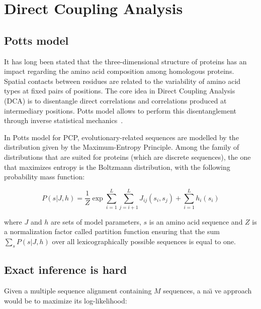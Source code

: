 \section{Direct Coupling Analysis}

    \subsection{Potts model} \label{potts}

        It has long been stated that the three-dimensional structure of proteins
        has an impact regarding the amino acid composition among
        homologous proteins. Spatial contacts between residues are related to
        the variability of amino acid types at fixed pairs of positions.
        The core idea in Direct Coupling Analysis (DCA) is to disentangle direct
        correlations and correlations produced at intermediary positions.
        Potts model allows to perform this disentanglement through inverse
        statistical mechanics~\cite{PhysRevE.87.012707}.

        In Potts model for PCP, evolutionary-related sequences are modelled by the distribution
        given by the Maximum-Entropy Principle. Among the family of distributions that are suited
        for proteins (which are discrete sequences), the one that maximizes entropy is the
        Boltzmann distribution, with the following probability mass function:

        \begin{equation}
            P(s \vert J, h) = \frac{1}{Z} \exp{\sum\limits_{i=1}^L \sum\limits_{j=i+1}^L J_{ij}(s_i, s_j) + \sum\limits_{i=1}^L h_i(s_i)}
        \end{equation}

        where $J$ and $h$ are sets of model parameters, $s$ is an amino acid sequence and
        $Z$ is a normalization factor called partition function ensuring
        that the sum $\sum_s P(s \vert J, h)$ over all lexicographically
        possible sequences is equal to one.

    \subsection{Exact inference is hard}

        Given a multiple sequence alignment containing $M$ sequences, a na\"\i
        ve approach would be to maximize its log-likelihood:

